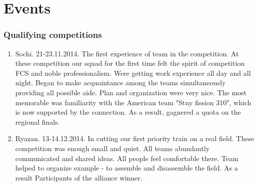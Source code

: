 \section{Events}
	\subsubsection{Qualifying competitions}
		\begin{enumerate}
			\item Sochi. 21-23.11.2014. The first experience of team in the competition. At these competition our squad for the first time felt the spirit of competition FCS and noble professionalism. Were getting work experience all day and all night. Began to make acquaintance among the teams simultaneously providing all possible aide.  Plan and organization were very nice. The most memorable was familiarity with the American team "Stuy fission 310", which is now supported by the connection. As a result, gagnered a quota on the regional finals.
			\begin{figure}[H]
			\end{figure}
			\item Ryazan. 13-14.12.2014. In cutting our first priority train on a real field. These competition was enough small and quiet. All teams abundantly communicated and shared ideas. All people feel comfortable there. Team helped to organize example - to assemble and disassemble the field. As a result Participants of the alliance winner. 
			\begin{figure}[H]

\end{figure}
\end{enumerate}
